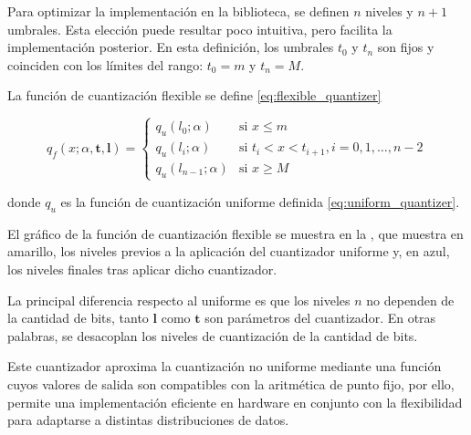 Para optimizar la implementación en la biblioteca, se definen $n$ niveles y $n+1$ umbrales. Esta elección puede resultar poco intuitiva, pero facilita la implementación posterior. En esta definición, los umbrales $t_0$ y $t_n$ son fijos y coinciden con los límites del rango: $t_0 = m$ y $t_n = M$.

La función de cuantización flexible se define \eqref{eq:flexible_quantizer}

\begin{equation}
    \label{eq:flexible_quantizer}
    q_{f}\left(x; \alpha, \mathbf{t}, \mathbf{l}\right) =
    \begin{cases}
        q_{u}\left(l_{0}; \alpha\right)& \text{si $x \leq m$} \\
        q_{u}\left(l_{i}; \alpha\right) & \text{si } t_i < x < t_{i+1}, i = 0, 1, \ldots, n-2 \\
        q_{u}\left(l_{n-1}; \alpha\right) & \text{si } x \geq M
    \end{cases}
\end{equation}

donde $q_{u}$ es la función de cuantización uniforme definida \eqref{eq:uniform_quantizer}.

El gráfico de la función de cuantización flexible se muestra en la , que muestra en amarillo, los niveles previos a la aplicación del cuantizador uniforme y, en azul, los niveles finales tras aplicar dicho cuantizador.

La principal diferencia respecto al uniforme es que los niveles $n$ no dependen de la cantidad de bits, tanto $\mathbf{l}$ como $\mathbf{t}$ son parámetros del cuantizador. En otras palabras, se desacoplan los niveles de cuantización de la cantidad de bits.

Este cuantizador aproxima la cuantización no uniforme mediante una función cuyos valores de salida son compatibles con la aritmética de punto fijo, por ello, permite una implementación eficiente en hardware en conjunto con la flexibilidad para adaptarse a distintas distribuciones de datos.

